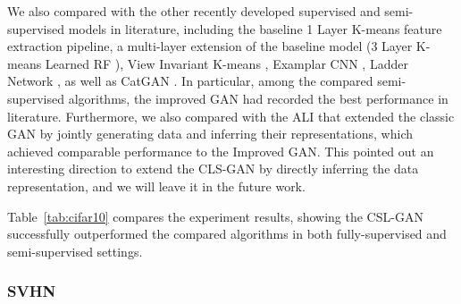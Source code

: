 We also compared with the other recently developed supervised and semi-supervised models in literature, including the baseline 1 Layer K-means feature extraction pipeline, a multi-layer extension of the baseline model (3 Layer K-means Learned RF \cite{coates2011selecting}), View Invariant K-means \cite{hui2013direct}, Examplar CNN \cite{dosovitskiydiscriminative}, Ladder Network \cite{rasmus2015semi}, as well as CatGAN \cite{springenberg2015unsupervised}.  In particular, among the compared semi-supervised algorithms, the improved GAN \cite{salimans2016improved} had recorded the best performance in literature.  Furthermore, we also compared with the ALI \cite{dumoulin2016adversarially} that extended the classic GAN by jointly generating data and inferring their representations, which achieved comparable performance to the Improved GAN. This pointed out an interesting direction to extend the CLS-GAN by directly inferring the data representation, and we will leave it in the future work.


Table~\ref{tab:cifar10} compares the experiment results, showing the CSL-GAN successfully outperformed the compared algorithms in both fully-supervised and semi-supervised settings.



\subsubsection{SVHN}

